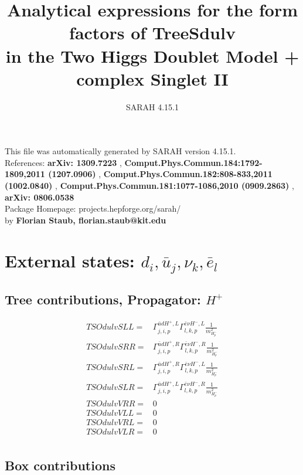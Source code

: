 \documentclass[A4,landscape]{article}
\begin{document}
\title{Analytical expressions for the form factors of TreeSdulv\\ in the Two Higgs Doublet Model + complex Singlet II } 
 \author{SARAH 4.15.1} 
 \maketitle 
 \vspace{10cm} 
This file was automatically generated by SARAH version 4.15.1.  \\ 
References: {\bf arXiv: 1309.7223 }, {\bf Comput.Phys.Commun.184:1792-1809,2011 (1207.0906) }, {\bf Comput.Phys.Commun.182:808-833,2011 (1002.0840) }, {\bf Comput.Phys.Commun.181:1077-1086,2010 (0909.2863) }, {\bf arXiv: 0806.0538 } \\ 
Package Homepage: projects.hepforge.org/sarah/ \\ 
by {\bf Florian Staub, florian.staub@kit.edu} 
 \pagebreak 
 \tableofcontents 
 \pagebreak 
\section{External states: ${d_{{i}}, \bar{u}_{{j}}, \nu_{{k}}, \bar{e}_{{l}}}$} 
\subsection{Tree contributions, Propagator: $H^+$} 

\begin{align} 
  TSOdulvSLL= & \Gamma^{\bar{u}d H^+,L}_{j, i, p} \Gamma^{\bar{e}\nu H^- ,L}_{l, k, p} \frac{1}{m^2_{H^-_{{p}}}} \\ 
  TSOdulvSRR= & \Gamma^{\bar{u}d H^+,R}_{j, i, p} \Gamma^{\bar{e}\nu H^- ,R}_{l, k, p} \frac{1}{m^2_{H^-_{{p}}}} \\ 
  TSOdulvSRL= & \Gamma^{\bar{u}d H^+,R}_{j, i, p} \Gamma^{\bar{e}\nu H^- ,L}_{l, k, p} \frac{1}{m^2_{H^-_{{p}}}} \\ 
  TSOdulvSLR= & \Gamma^{\bar{u}d H^+,L}_{j, i, p} \Gamma^{\bar{e}\nu H^- ,R}_{l, k, p} \frac{1}{m^2_{H^-_{{p}}}} \\ 
  TSOdulvVRR= & 0 \\ 
  TSOdulvVLL= & 0 \\ 
  TSOdulvVRL= & 0 \\ 
  TSOdulvVLR= & 0 \\ 
\end{align} 
\subsection{Box contributions} 
\end{document}
